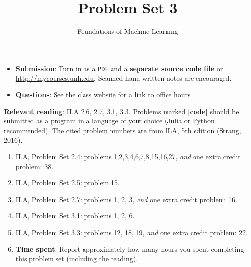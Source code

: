 \documentclass[letterpaper]{article}
\title{Problem Set 3}
\author{Foundations of Machine Learning}
\date{}
\begin{document}
\maketitle

\begin{itemize}
\item \textbf{Submission}: Turn in as a \texttt{PDF} and a \textbf{separate source code file} on \url{http://mycourses.unh.edu}. Scanned hand-written notes are encouraged.
\item \textbf{Questions}: See the class website for a link to office hours
\end{itemize}


\textbf{Relevant reading}: ILA 2.6, 2.7, 3.1, 3.3. Problems marked \textbf{[code]} should be submitted as a program in a language of your choice (Julia or Python recommended). The cited problem numbers are from ILA, 5th edition (Strang, 2016).

\begin{enumerate}
\item ILA, Problem Set 2.4: problems 1,2,3,4,6,7,8,15,16,27, \emph{and} one extra credit problem: 38.
\item ILA, Problem Set 2.5: problem 15.
\item ILA, Problem Set 2.7: problems 1, 2, 3, \emph{and} one extra credit problem: 16.
\item ILA, Problem Set 3.1: problems 1, 2, 6.
\item ILA, Problem Set 3.3: problems 12, 18, 19, \emph{and} one extra credit problem: 22.
  
\item \textbf{Time spent.} Report approximately how many hours you spent completing this problem set (including the reading).
\end{enumerate}
\end{document}
